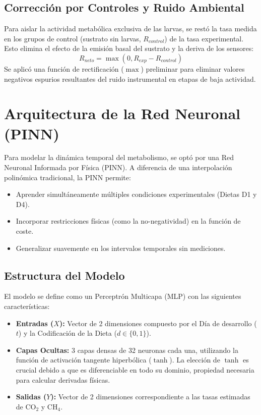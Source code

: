 \subsection{Corrección por Controles y Ruido Ambiental}
Para aislar la actividad metabólica exclusiva de las larvas, se restó la tasa medida en los grupos de control (sustrato sin larvas, $R_{control}$) de la tasa experimental. Esto elimina el efecto de la emisión basal del sustrato y la deriva de los sensores:
\begin{equation}
    R_{neto} = \max(0, R_{exp} - R_{control})
\end{equation}
Se aplicó una función de rectificación ($\max$) preliminar para eliminar valores negativos espurios resultantes del ruido instrumental en etapas de baja actividad.

\section{Arquitectura de la Red Neuronal (PINN)}

Para modelar la dinámica temporal del metabolismo, se optó por una Red Neuronal Informada por Física (PINN). A diferencia de una interpolación polinómica tradicional, la PINN permite:
\begin{itemize}
    \item Aprender simultáneamente múltiples condiciones experimentales (Dietas D1 y D4).
    \item Incorporar restricciones físicas (como la no-negatividad) en la función de coste.
    \item Generalizar suavemente en los intervalos temporales sin mediciones.
\end{itemize}

\subsection{Estructura del Modelo}
El modelo se define como un Perceptrón Multicapa (MLP) con las siguientes características:
\begin{itemize}
    \item \textbf{Entradas ($X$):} Vector de 2 dimensiones compuesto por el Día de desarrollo ($t$) y la Codificación de la Dieta ($d \in \{0, 1\}$).
    \item \textbf{Capas Ocultas:} 3 capas densas de 32 neuronas cada una, utilizando la función de activación tangente hiperbólica ($\tanh$). La elección de $\tanh$ es crucial debido a que es diferenciable en todo su dominio, propiedad necesaria para calcular derivadas físicas.
    \item \textbf{Salidas ($Y$):} Vector de 2 dimensiones correspondiente a las tasas estimadas de CO$_2$ y CH$_4$.
\end{itemize}

